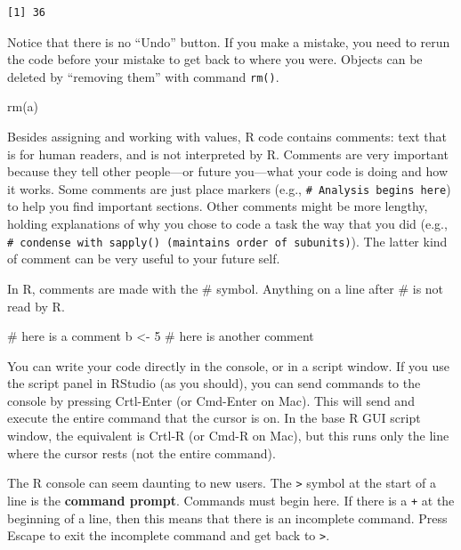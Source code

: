 \documentclass[
  13,
  letterpaper,
]{report}
\newenvironment{Shaded}{\begin{snugshade}}{\end{snugshade}}
\newcommand{\CommentTok}[1]{\textcolor[rgb]{0.37,0.37,0.37}{#1}}
\newcommand{\DecValTok}[1]{\textcolor[rgb]{0.68,0.00,0.00}{#1}}
\newcommand{\FunctionTok}[1]{\textcolor[rgb]{0.28,0.35,0.67}{#1}}
\newcommand{\NormalTok}[1]{\textcolor[rgb]{0.00,0.23,0.31}{#1}}
\newcommand{\OtherTok}[1]{\textcolor[rgb]{0.00,0.23,0.31}{#1}}
\begin{document}
\begin{verbatim}
[1] 36
\end{verbatim}

Notice that there is no ``Undo'' button. If you make a mistake, you need
to rerun the code before your mistake to get back to where you were.
Objects can be deleted by ``removing them'' with command \texttt{rm()}.

\begin{Shaded}
\begin{Highlighting}[]
\FunctionTok{rm}\NormalTok{(a)}
\end{Highlighting}
\end{Shaded}

Besides assigning and working with values, R code contains comments:
text that is for human readers, and is not interpreted by R. Comments
are very important because they tell other people---or future you---what
your code is doing and how it works. Some comments are just place
markers (e.g., \texttt{\#\ Analysis\ begins\ here}) to help you find
important sections. Other comments might be more lengthy, holding
explanations of why you chose to code a task the way that you did (e.g.,
\texttt{\#\ condense\ with\ sapply()\ (maintains\ order\ of\ subunits)}).
The latter kind of comment can be very useful to your future self.

In R, comments are made with the \# symbol. Anything on a line after \#
is not read by R.

\begin{Shaded}
\begin{Highlighting}[]
\CommentTok{\# here is a comment}
\NormalTok{b }\OtherTok{\textless{}{-}} \DecValTok{5} \CommentTok{\# here is another comment}
\end{Highlighting}
\end{Shaded}

You can write your code directly in the console, or in a script window.
If you use the script panel in RStudio (as you should), you can send
commands to the console by pressing Crtl-Enter (or Cmd-Enter on Mac).
This will send and execute the entire command that the cursor is on. In
the base R GUI script window, the equivalent is Crtl-R (or Cmd-R on
Mac), but this runs only the line where the cursor rests (not the entire
command).

The R console can seem daunting to new users. The
\texttt{\textgreater{}} symbol at the start of a line is the
\textbf{command prompt}. Commands must begin here. If there is a
\texttt{+} at the beginning of a line, then this means that there is an
incomplete command. Press Escape to exit the incomplete command and get
back to \texttt{\textgreater{}}.
\end{document}
